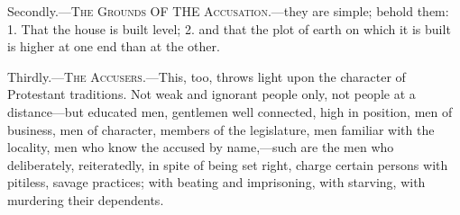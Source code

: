 Secondly.—T\textsc{he} G\textsc{rounds}
OF THE A\textsc{ccusation}.—they are simple; behold them: 1. That
the house is built level; 2. and that the plot of earth
on which it is built is higher at one end than at the
other.

Thirdly.—T\textsc{he} A\textsc{ccusers}.—This, too, throws
light upon the character of Protestant traditions. Not
weak and ignorant people only, not people at a
distance—but educated men, gentlemen well connected,
high in position, men of business, men of character,
members of the legislature, men familiar with the
locality, men who know the accused by name,—such are
the men who deliberately, reiteratedly, in spite of being
set right, charge certain persons with pitiless, savage
practices; with beating and imprisoning, with starving,
with murdering their dependents.

